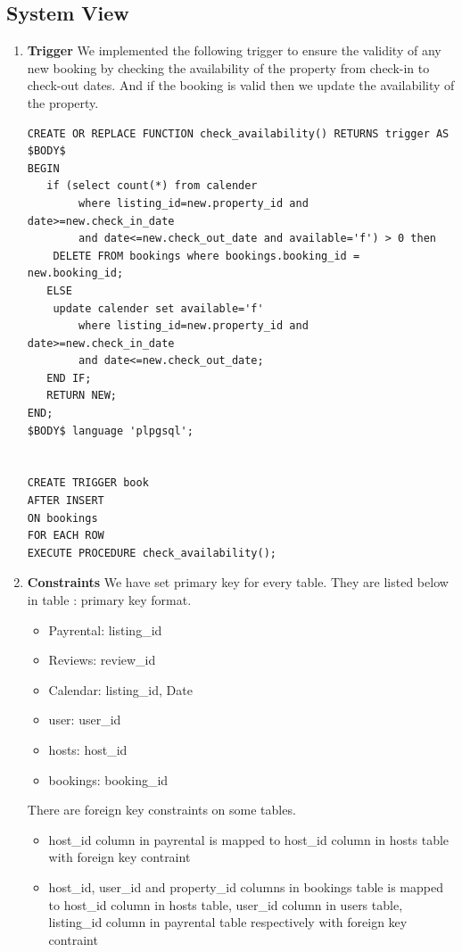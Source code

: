 \documentclass[10pt]{article}
\begin{document}
\subsection{System View}
\begin{enumerate}
    \item \textbf{Trigger} \newline
    We implemented the following trigger to ensure the validity of any new booking by checking the availability of the property from check-in to check-out dates. And if the booking is valid then we update the availability of the property.
    \begin{verbatim}
CREATE OR REPLACE FUNCTION check_availability() RETURNS trigger AS 
$BODY$
BEGIN
   if (select count(*) from calender 
        where listing_id=new.property_id and date>=new.check_in_date 
        and date<=new.check_out_date and available='f') > 0 then
    DELETE FROM bookings where bookings.booking_id = new.booking_id;
   ELSE
    update calender set available='f' 
        where listing_id=new.property_id and date>=new.check_in_date 
        and date<=new.check_out_date;
   END IF;
   RETURN NEW;
END;
$BODY$ language 'plpgsql';


CREATE TRIGGER book
AFTER INSERT
ON bookings
FOR EACH ROW
EXECUTE PROCEDURE check_availability();
    \end{verbatim}

\item \textbf{Constraints} \newline
We have set primary key for every table. They are listed below in table : primary key format. 
\begin{itemize}
    \item Payrental: listing\_id
    \item Reviews: review\_id
    \item Calendar: listing\_id, Date
    \item user: user\_id
    \item hosts: host\_id
    \item bookings: booking\_id
\end{itemize}
There are foreign key constraints on some tables.
\begin{itemize}
    \item host\_id column in payrental is mapped to host\_id column in hosts table with foreign key contraint
    \item host\_id, user\_id and property\_id columns in bookings table is mapped to host\_id column in hosts table, user\_id column in users table, listing\_id column in payrental table respectively with foreign key contraint
\end{itemize}



\end{enumerate}
\end{document}
